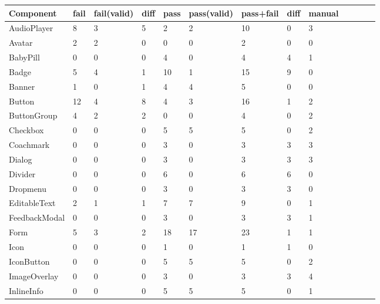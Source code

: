 \documentclass{master_thesis}
\begin{document}
\begin{table}[!ht]
    \centering
    \begin{tabular}{|l|l|l|l|l|l|l|l|l|l|l|l|l|}
    \hline
        Component & fail & fail(valid) & diff & pass & pass(valid) & pass+fail & diff & manual  \\ \hline
        AudioPlayer & 8 & 3 & 5 & 2 & 2 & 10 & 0 & 3  \\ \hline
        Avatar & 2 & 2 & 0 & 0 & 0 & 2 & 0 & 0  \\ \hline
        BabyPill & 0 & 0 & 0 & 4 & 0 & 4 & 4 & 1  \\ \hline
        Badge & 5 & 4 & 1 & 10 & 1 & 15 & 9 & 0  \\ \hline
        Banner & 1 & 0 & 1 & 4 & 4 & 5 & 0 & 0  \\ \hline
        Button & 12 & 4 & 8 & 4 & 3 & 16 & 1 & 2  \\ \hline
        ButtonGroup & 4 & 2 & 2 & 0 & 0 & 4 & 0 & 2  \\ \hline
        Checkbox & 0 & 0 & 0 & 5 & 5 & 5 & 0 & 2  \\ \hline
        Coachmark & 0 & 0 & 0 & 3 & 0 & 3 & 3 & 3  \\ \hline
        Dialog & 0 & 0 & 0 & 3 & 0 & 3 & 3 & 3  \\ \hline
        Divider & 0 & 0 & 0 & 6 & 0 & 6 & 6 & 0  \\ \hline
        Dropmenu & 0 & 0 & 0 & 3 & 0 & 3 & 3 & 0  \\ \hline
        EditableText & 2 & 1 & 1 & 7 & 7 & 9 & 0 & 1  \\ \hline
        FeedbackModal & 0 & 0 & 0 & 3 & 0 & 3 & 3 & 1  \\ \hline
        Form & 5 & 3 & 2 & 18 & 17 & 23 & 1 & 1  \\ \hline
        Icon & 0 & 0 & 0 & 1 & 0 & 1 & 1 & 0  \\ \hline
        IconButton & 0 & 0 & 0 & 5 & 5 & 5 & 0 & 2  \\ \hline
        ImageOverlay & 0 & 0 & 0 & 3 & 0 & 3 & 3 & 4  \\ \hline
        InlineInfo & 0 & 0 & 0 & 5 & 5 & 5 & 0 & 1  \\ \hline
    \end{tabular}
\end{table}
\end{document}
